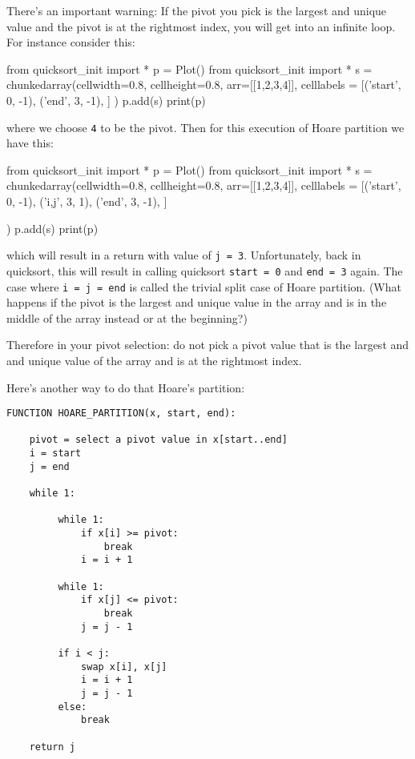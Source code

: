 There's an important warning:
If the pivot you pick
is the largest and unique value and the pivot is
at the rightmost index,
you will get into an infinite loop.
For instance consider this:
\begin{python}
from quicksort_init import *
p = Plot()
from quicksort_init import *
s = chunkedarray(cellwidth=0.8, 
                   cellheight=0.8,
                   arr=[[1,2,3,4]],
                   celllabels = [('start', 0, -1),
                                 ('end',   3, -1),
                                ]
)
p.add(s)
print(p)
\end{python}
where we choose \verb!4! to be the pivot.
Then for this execution of Hoare partition we have this:
\begin{python}
from quicksort_init import *
p = Plot()
from quicksort_init import *
s = chunkedarray(cellwidth=0.8, 
                   cellheight=0.8,
                   arr=[[1,2,3,4]],
                   celllabels = [('start', 0, -1),
                                 ('i,j', 3, 1),
                                 ('end',   3, -1),
                                ]
                                
)
p.add(s)
print(p)
\end{python}
which will result in a return with value of \verb!j = 3!.
Unfortunately, back in quicksort, this will result in
calling quicksort \verb!start = 0! and \verb!end = 3! again.
The case where \verb!i = j = end! is called the trivial split case of
Hoare partition.
(What happens if the pivot is the largest and unique value in the array
and is in the middle of the array instead or at the beginning?)

Therefore in your pivot selection:
do not pick a pivot value that is the largest and and unique value
of the array and is at the rightmost index.

Here's another way to do that Hoare's partition:
\begin{Verbatim}[frame=single,fontsize=\footnotesize]
FUNCTION HOARE_PARTITION(x, start, end):

    pivot = select a pivot value in x[start..end]
    i = start
    j = end

    while 1:

         while 1:
             if x[i] >= pivot:
                 break
             i = i + 1

         while 1:
             if x[j] <= pivot:
                 break
             j = j - 1

         if i < j:
             swap x[i], x[j]
             i = i + 1
             j = j - 1
         else:
             break

    return j
\end{Verbatim}



